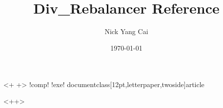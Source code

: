 <+	+>	!comp!	!exe!
%
documentclass[12pt,letterpaper,twoside]{article}
\usepackage[dvips]{graphics}
 \usepackage{multirow}
\usepackage[hmargin={0.8in,0.8in}]{geometry}
\usepackage{amscd, epsfig,amssymb,euscript,subfigure}
 \usepackage{amsmath}
\usepackage{listings}
\usepackage{subfig}
\usepackage{pgf,pgfarrows,pgfnodes,pgfautomata,pgfheaps,pgfshade}
\usepackage{tikz}
\usepackage{graphicx}


\title{Div\_Rebalancer Reference}
 \author{Nick Yang Cai}
 \date{\today}
\maketitle
\medskip
\medskip
\medskip
\tableofcontents  %

\newpage
<++>

